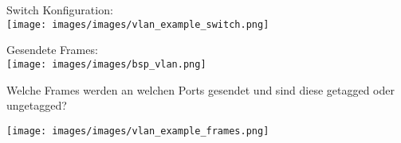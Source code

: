 \begin{example}
    \begin{minipage}{0.44\linewidth}
        Switch Konfiguration:\\
        \texttt{[image: images/images/vlan\_example\_switch.png]}
    \end{minipage}
    \begin{minipage}{0.55\linewidth}
        Gesendete Frames:\\
        \texttt{[image: images/images/bsp\_vlan.png]}
    \end{minipage}
    
    \begin{minipage}{0.4\linewidth}
        Welche Frames werden an welchen Ports gesendet und sind diese getagged oder \\ungetagged?
    \end{minipage}
    \hspace{5mm}
    \begin{minipage}{0.5\linewidth}
        \texttt{[image: images/images/vlan\_example\_frames.png]}
    \end{minipage}    
\end{example}








